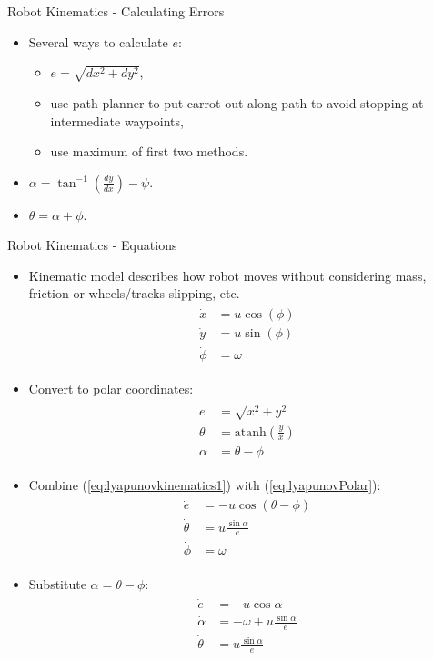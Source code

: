\documentclass[hyperref={pdfpagelabels=false}]{beamer}
\begin{document}
\begin{frame}{Robot Kinematics - Calculating Errors}
\begin{itemize}
\item Several ways to calculate $e$:
\begin{itemize}
\item $e=\sqrt{dx^2+dy^2}$,
\item use path planner to put carrot out along path to avoid stopping at intermediate waypoints,
\item use maximum of first two methods.
\end{itemize}
\item $\alpha=\tan^{-1}\left(\tfrac{dy}{dx}\right) - \psi$.
\item $\theta=\alpha+\phi$.
\end{itemize}
\end{frame}

\begin{frame}[allowframebreaks]{Robot Kinematics - Equations}
\begin{itemize}
\item Kinematic model describes how robot moves without considering mass, friction or wheels/tracks slipping, etc.
\begin{align}
\label{eq:lyapunovkinematics1}
\begin{split}
\dot{x} &= u\cos(\phi) \\
\dot{y} &= u\sin(\phi) \\
\dot{\phi} &= \omega
\end{split}
\end{align}
\item Convert to polar coordinates:
\begin{align}
\label{eq:lyapunovPolar}
\begin{split}
e &= \sqrt{x^2+y^2} \\
\theta &= \text{atanh}\left(\tfrac{y}{x}\right) \\
\alpha &= \theta - \phi
\end{split}
\end{align}
\item Combine (\ref{eq:lyapunovkinematics1}) with (\ref{eq:lyapunovPolar}):
\begin{align*}
\begin{split}
\dot{e} &= -u\cos(\theta-\phi) \\
\dot{\theta} &= u\frac{\sin\alpha}{e} \\
\dot{\phi} &= \omega
\end{split}
\end{align*}
\item Substitute $\alpha=\theta-\phi$:
\begin{align}
\label{eq:lyapunovkinematics}
\begin{split}
\dot{e} &= -u\cos\alpha \\
\dot{\alpha} &= -\omega + u\frac{\sin\alpha}{e} \\
\dot{\theta} &= u\frac{\sin\alpha}{e}
\end{split}
\end{align}
\end{itemize}
\end{frame}
\end{document}
